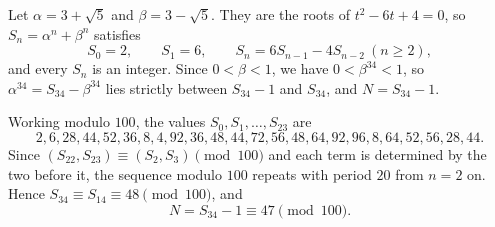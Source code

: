 Let $\alpha=3+\sqrt5$ and $\beta=3-\sqrt5$. They are the roots of $t^2-6t+4=0$, so $S_n=\alpha^n+\beta^n$ satisfies
\[S_0=2,\qquad S_1=6,\qquad S_n=6S_{n-1}-4S_{n-2}\ (n\ge2),\]
and every $S_n$ is an integer. Since $0<\beta<1$, we have $0<\beta^{34}<1$, so $\alpha^{34}=S_{34}-\beta^{34}$ lies strictly between $S_{34}-1$ and $S_{34}$, and $N=S_{34}-1$.

Working modulo $100$, the values $S_0,S_1,\dots,S_{23}$ are
\[2,6,28,44,52,36,8,4,92,36,48,44,72,56,48,64,92,96,8,64,52,56,28,44.\]
Since $(S_{22},S_{23})\equiv(S_2,S_3)\pmod{100}$ and each term is determined by the two before it, the sequence modulo $100$ repeats with period $20$ from $n=2$ on. Hence $S_{34}\equiv S_{14}\equiv48\pmod{100}$, and
\[N=S_{34}-1\equiv\boxed{47}\pmod{100}.\]

